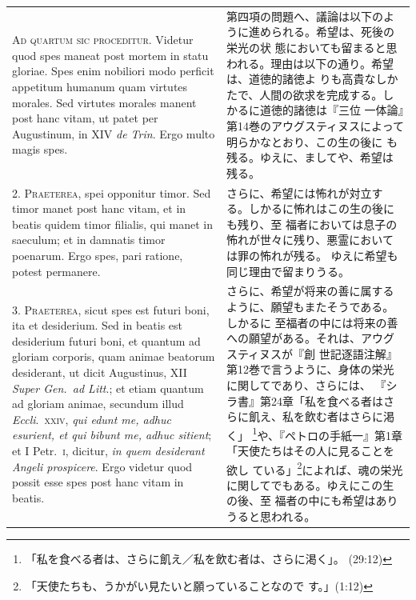 \documentclass[paper=a4paper,fontsize=10pt,jafontsize=9pt,titlepage]{jlreq}
\begin{document}
\begin{longtable}{p{21em}p{21em}}
 {\scshape Ad quartum sic proceditur}. Videtur quod spes maneat post
 mortem in statu gloriae. Spes enim nobiliori modo perficit appetitum
 humanum quam virtutes morales. Sed virtutes morales manent post hanc
 vitam, ut patet per Augustinum, in XIV {\itshape de Trin}. Ergo multo
 magis spes.

 &

 第四項の問題へ、議論は以下のように進められる。希望は、死後の栄光の状
 態においても留まると思われる。理由は以下の通り。希望は、道徳的諸徳よ
 りも高貴なしかたで、人間の欲求を完成する。しかるに道徳的諸徳は『三位
 一体論』第14巻のアウグスティヌスによって明らかなとおり、この生の後に
 も残る。ゆえに、ましてや、希望は残る。


\\

2. {\scshape Praeterea}, spei opponitur timor. Sed timor manet post
hanc vitam, et in beatis quidem timor filialis, qui manet in saeculum;
et in damnatis timor poenarum. Ergo spes, pari ratione, potest
permanere.
 

 &

 さらに、希望には怖れが対立する。しかるに怖れはこの生の後にも残り、至
 福者においては息子の怖れが世々に残り、悪霊においては罪の怖れが残る。
 ゆえに希望も同じ理由で留まりうる。


 \\
 
3. {\scshape Praeterea}, sicut spes est futuri boni, ita et
desiderium. Sed in beatis est desiderium futuri boni, et quantum ad
gloriam corporis, quam animae beatorum desiderant, ut dicit
Augustinus, XII {\itshape Super Gen.~ad Litt}.; et etiam quantum ad
gloriam animae, secundum illud {\itshape Eccli}.~{\scshape xxiv},
{\itshape qui edunt me, adhuc esurient, et qui bibunt me, adhuc
sitient}; et I Petr.~{\scshape i}, dicitur, {\itshape in quem
desiderant Angeli prospicere}. Ergo videtur quod possit esse spes post
hanc vitam in beatis.
 
 &

 さらに、希望が将来の善に属するように、願望もまたそうである。しかるに
 至福者の中には将来の善への願望がある。それは、アウグスティヌスが『創
 世記逐語注解』第12巻で言うように、身体の栄光に関してであり、さらには、
 『シラ書』第24章「私を食べる者はさらに飢え、私を飲む者はさらに渇く」
 \footnote{「私を食べる者は、さらに飢え／私を飲む者は、さらに渇く」。
 (29:12)}や、『ペトロの手紙一』第1章「天使たちはその人に見ることを欲し
 ている」\footnote{「天使たちも、うかがい見たいと願っていることなので
 す。」(1:12)}によれば、魂の栄光に関してでもある。ゆえにこの生の後、至
 福者の中にも希望はありうると思われる。


\end{longtable}
\end{document}
